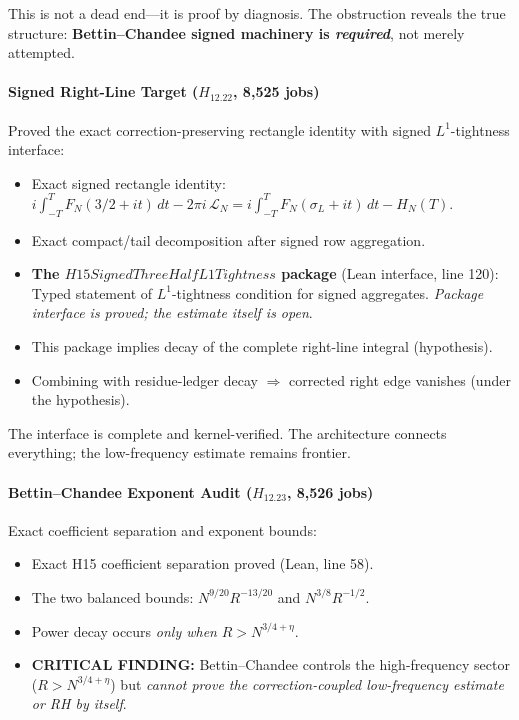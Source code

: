 \documentclass[11pt,a4paper]{article}
\theoremstyle{plain}
\theoremstyle{definition}
\theoremstyle{remark}
\begin{document}
This is not a dead end---it is proof by diagnosis. The obstruction reveals the true structure: \textbf{Bettin--Chandee signed machinery is \emph{required}}, not merely attempted.

\paragraph{Signed Right-Line Target ($H_{12.22}$, 8,525 jobs)}

Proved the exact correction-preserving rectangle identity with signed $L^1$-tightness interface:
\begin{itemize}[leftmargin=2em]
  \item Exact signed rectangle identity: $i\int_{-T}^{T}F_N(3/2+it)\,dt - 2\pi i\,\mathcal{L}_N = i\int_{-T}^{T}F_N(\sigma_L+it)\,dt - H_N(T)$.
  \item Exact compact/tail decomposition after signed row aggregation.
  \item \textbf{The $H15SignedThreeHalfL1Tightness$ package} (Lean interface, line 120): Typed statement of $L^1$-tightness condition for signed aggregates. \emph{Package interface is proved; the estimate itself is open}.
  \item This package implies decay of the complete right-line integral (hypothesis).
  \item Combining with residue-ledger decay $\Rightarrow$ corrected right edge vanishes (under the hypothesis).
\end{itemize}

The interface is complete and kernel-verified. The architecture connects everything; the low-frequency estimate remains frontier.

\paragraph{Bettin--Chandee Exponent Audit ($H_{12.23}$, 8,526 jobs)}

Exact coefficient separation and exponent bounds:
\begin{itemize}[leftmargin=2em]
  \item Exact H15 coefficient separation proved (Lean, line 58).
  \item The two balanced bounds: $N^{9/20}R^{-13/20}$ and $N^{3/8}R^{-1/2}$.
  \item Power decay occurs \emph{only when} $R > N^{3/4+\eta}$.
  \item \textbf{CRITICAL FINDING:} Bettin--Chandee controls the high-frequency sector ($R > N^{3/4+\eta}$) but \emph{cannot prove the correction-coupled low-frequency estimate or RH by itself}.
\end{itemize}
\end{document}
